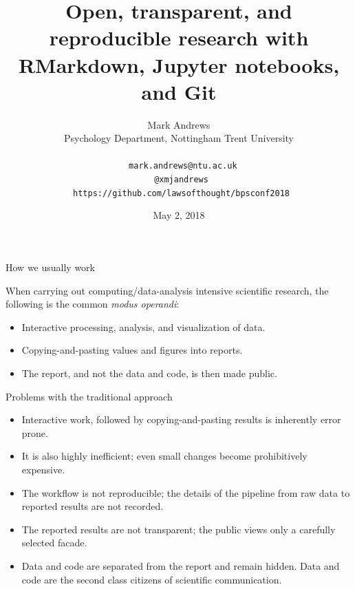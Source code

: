 \documentclass[10pt,ignorenonframetext,]{beamer}
\title{Open, transparent, and reproducible research with RMarkdown, Jupyter
notebooks, and Git}
\author{Mark Andrews\\
Psychology Department, Nottingham Trent University\\
~\\
\faEnvelopeO~ \texttt{mark.andrews@ntu.ac.uk}\\
\faTwitter~\texttt{@xmjandrews}\\
\faGithub~\texttt{https://github.com/lawsofthought/bpsconf2018}}
\date{May 2, 2018}
\providecommand{\tightlist}{%
  \setlength{\itemsep}{0pt}\setlength{\parskip}{0pt}}
\begin{document}
\frame{\titlepage}

\begin{frame}{How we usually work}
\protect\hypertarget{how-we-usually-work}{}

When carrying out computing/data-analysis intensive scientific research,
the following is the common \emph{modus operandi}:

\begin{itemize}
\tightlist
\item
  Interactive processing, analysis, and visualization of data.
\item
  Copying-and-pasting values and figures into reports.
\item
  The report, and not the data and code, is then made public.
\end{itemize}

\end{frame}

\begin{frame}{Problems with the traditional approach}
\protect\hypertarget{problems-with-the-traditional-approach}{}

\begin{itemize}
\tightlist
\item
  Interactive work, followed by copying-and-pasting results is
  inherently error prone.
\item
  It is also highly inefficient; even small changes become prohibitively
  expensive.
\item
  The workflow is not reproducible; the details of the pipeline from raw
  data to reported results are not recorded.
\item
  The reported results are not transparent; the public views only a
  carefully selected facade.
\item
  Data and code are separated from the report and remain hidden. Data
  and code are the second class citizens of scientific communication.
\end{itemize}

\end{frame}
\end{document}
